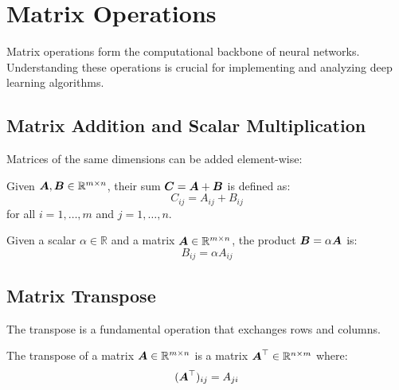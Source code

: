 
\section{Matrix Operations}
\label{sec:matrix-operations}

Matrix operations form the computational backbone of neural networks. Understanding these operations is crucial for implementing and analyzing deep learning algorithms.

\subsection{Matrix Addition and Scalar Multiplication}

Matrices of the same dimensions can be added element-wise:

\begin{definition}
Given $\boldsymbol{A}, \boldsymbol{B} \in \mathbb{R}^{m \times n}$, their sum $\boldsymbol{C} = \boldsymbol{A} + \boldsymbol{B}$ is defined as:
\begin{equation}
    C_{ij} = A_{ij} + B_{ij}
\end{equation}
for all $i = 1, \ldots, m$ and $j = 1, \ldots, n$.
\end{definition}

\begin{definition}
Given a scalar $\alpha \in \mathbb{R}$ and a matrix $\boldsymbol{A} \in \mathbb{R}^{m \times n}$, the product $\boldsymbol{B} = \alpha\boldsymbol{A}$ is:
\begin{equation}
    B_{ij} = \alpha A_{ij}
\end{equation}
\end{definition}

\subsection{Matrix Transpose}

The transpose is a fundamental operation that exchanges rows and columns.

\begin{definition}[Transpose]
The transpose of a matrix $\boldsymbol{A} \in \mathbb{R}^{m \times n}$ is a matrix $\boldsymbol{A}^\top \in \mathbb{R}^{n \times m}$ where:
\begin{equation}
    (\boldsymbol{A}^\top)_{ij} = A_{ji}
\end{equation}
\end{definition}

